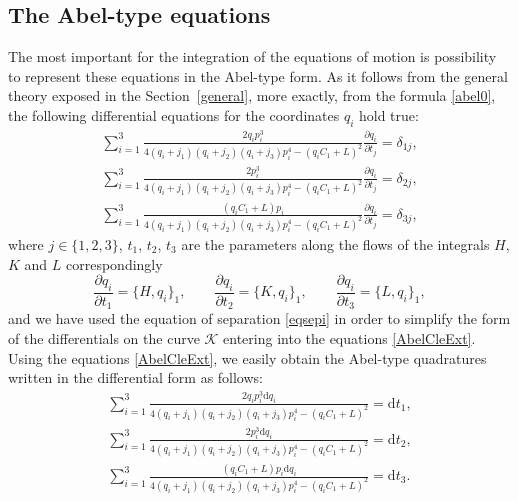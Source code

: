 \documentclass[pdftex]{sigma}
\def\d{\delta}
\numberwithin{equation}{section}
\begin{document}
\subsection{The Abel-type equations}
The most important for the integration of the equations of motion is possibility to represent these equations in the Abel-type form.
As it follows from the general theory exposed in the Section~\ref{general}, more exactly, from the formula \eqref{abel0}, the following differential equations for the coordinates $q_i$ hold true:
\begin{subequations}\label{AbelCleExt}
\begin{gather}
\sum\limits_{i=1}^3 \frac{2 q_i p_i^3 }{ 4 (q_i+j_1) (q_i+j_2)(q_i+j_3) p^4_i-(q_i C_1+L)^2}\frac{ \partial q_i}{\partial t_j} = \d_{1j},
\\
\sum\limits_{i=1}^3 \frac{2 p_i^3 }{ 4 (q_i+j_1) (q_i+j_2)(q_i+j_3) p^4_i-(q_i C_1+L)^2} \frac{ \partial q_i}{\partial t_j} = \d_{2j},
\\
\sum\limits_{i=1}^3 \frac{ (q_i C_1+L) p_i }{ 4 (q_i+j_1) (q_i+j_2)(q_i+j_3) p^4_i-(q_i C_1+L)^2}\frac{ \partial q_i}{\partial t_j} = \d_{3j},
\end{gather}
\end{subequations}
 where $j\in \{1,2,3\}$, $t_1$, $t_2$, $t_3$ are the parameters along the flows of the integrals $H$, $K$ and $L$ correspondingly
\[
\frac{\partial q_i}{\partial t_1}=\{H,q_i\}_1, \qquad \frac{\partial q_i}{\partial t_2}=\{K,q_i\}_1, \qquad \frac{\partial q_i}{\partial t_3}=\{L,q_i\}_1,
\]
and we have used the equation of separation \eqref{eqsepi} in order to simplify the form of the differentials on the curve $\mathcal{K}$ entering into the equations \eqref{AbelCleExt}. Using the equations \eqref{AbelCleExt}, we easily obtain the Abel-type quadratures written in the differential form as follows:
\begin{subequations}\label{AbelCleExt'}
\begin{gather}
\sum\limits_{i=1}^3 \frac{2 q_i p_i^3 \mathrm{d}q_i}{ 4 (q_i+j_1) (q_i+j_2)(q_i+j_3) p^4_i-(q_i C_1+L)^2} = \mathrm{d} t_1,
\\
\sum\limits_{i=1}^3 \frac{2 p_i^3 \mathrm{d} q_i}{ 4 (q_i+j_1) (q_i+j_2)(q_i+j_3) p^4_i-(q_i C_1+L)^2} = \mathrm{d} t_2,
\\
\sum\limits_{i=1}^3 \frac{ (q_i C_1+L) p_i \mathrm{d} q_i}{ 4 (q_i+j_1) (q_i+j_2)(q_i+j_3) p^4_i-(q_i C_1+L)^2} = \mathrm{d} t_3.
\end{gather}
\end{subequations}
\end{document}

